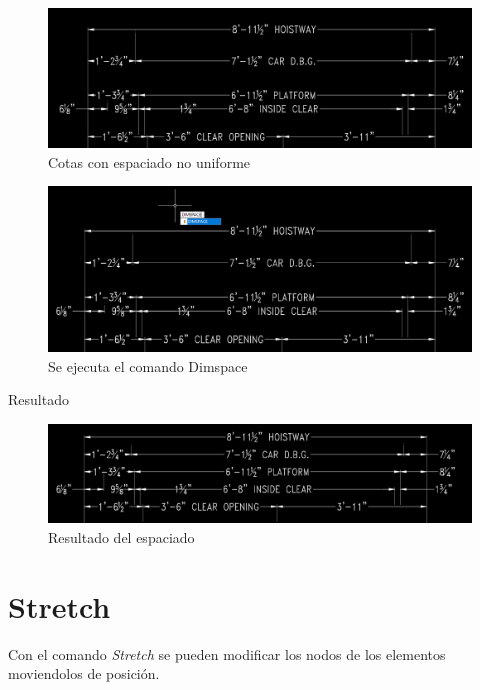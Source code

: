 \documentclass[12pt,letterpaper,final]{report}
\begin{document}
\begin{figure}[H]
	\centering
	\includegraphics[width=0.85\linewidth, height=0.5\textheight,keepaspectratio]{Imagenes/autocad_dimspace_01}
	\caption{Cotas con espaciado no uniforme}
	\label{fig:autocaddimspace01}
\end{figure}

\begin{figure}[H]
	\centering
	\includegraphics[width=0.85\linewidth, height=0.5\textheight,keepaspectratio]{Imagenes/autocad_dimspace_02}
	\caption{Se ejecuta el comando Dimspace}
	\label{fig:autocaddimspace02}
\end{figure}

{\LARGE Resultado}

\begin{figure}[H]
	\centering
	\includegraphics[width=0.85\linewidth, height=0.5\textheight,keepaspectratio]{Imagenes/autocad_dimspace_03}
	\caption{Resultado del espaciado}
	\label{fig:autocaddimspace03}
\end{figure}



\chapter{Stretch}

Con el comando \emph{Stretch} se pueden modificar los nodos de los elementos moviendolos de posición.
\end{document}

